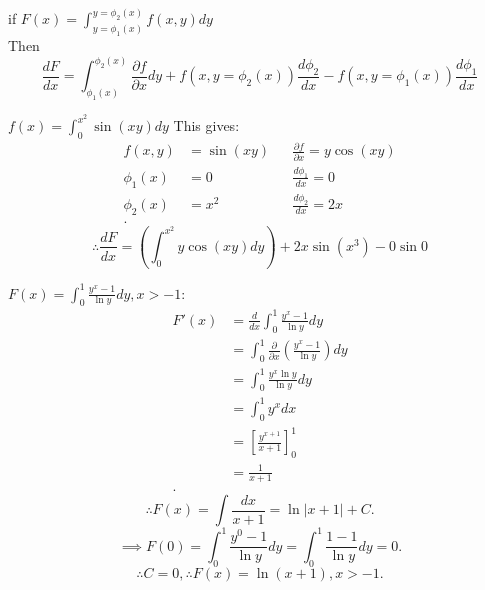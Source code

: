 \begin{itemize}
\begin{theorem}
			if $F(x) = \int_{y = \phi_1(x)}^{y = \phi_2(x)} f\left( x,y \right) dy $ \\
			Then 
			$$
			\frac{dF}{dx} = \int_{\phi_1(x)}^{\phi_2(x)} \frac{\partial f}{\partial x} dy + f\left( x,y=\phi_2(x) \right) \frac{d\phi_2}{dx} - f\left( x,y =\phi_1(x)\right)  \frac{d\phi_1}{dx}
			$$
		\end{theorem}
		\begin{example}
			$f\left( x \right)  = \int_{0}^{x^2} \sin\left( xy \right) dy $ 
			This gives:
			\begin{align*}
				f\left( x,y \right)  &= \sin(xy) && \frac{\partial f}{\partial x}  = y\cos(xy)\\
				\phi_1(x) &= 0 && \frac{d\phi_1}{dx} = 0 \\
				\phi_2(x) &=  x^2 && \frac{d\phi_2}{dx} = 2x \\
			.\end{align*}
			$$
\therefore \frac{dF}{dx} = \left(\int_{0}^{x^2} y \cos (xy) dy\right)  + 2x \sin(x^3) - 0 \sin 0
			$$
		\end{example}
		\begin{example}
			$F\left( x \right) = \int_{0}^{1} \frac{y^{x}-1}{\ln y}dy, x > -1 $:
			\begin{align*}
				F'(x) &=  \frac{d}{dx} \int_{0}^{1} \frac{y^{x}-1}{\ln y}dy  \\
				&= \int_{0}^{1} \frac{\partial }{\partial x} \left( \frac{y^{x}-1}{\ln y} \right) dy  \\
				&= \int_{0}^{1} \frac{y^{x}\ln y}{\ln y}dy  \\
				&= \int_{0}^{1} y^{x}dx  \\
				&= \left[ \frac{y^{x + 1}}{x + 1} \right] _0 ^ 1 \\
				&= \frac{1}{x+1} \\
			.\end{align*}
			\[
			\therefore F(x) = \int \frac{dx}{x+1} = \ln \left| x + 1 \right| + C
			.\] 
			\[
			 \implies F(0) = \int_{0}^{1} \frac{y^0 - 1}{\ln y} dy = \int_{0}^{1} \frac{1-1}{\ln y}dy = 0  
			.\] 
			\[
			\therefore C = 0, \therefore  F(x) = \ln(x+1), x>-1
			.\] 
		\end{example}
\end{itemize}
